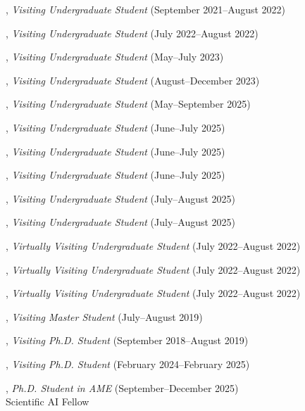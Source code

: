 \documentclass[10pt]{article}
\newenvironment{myindentpar}[1]%
{\begin{list}{}%
         {\setlength{\leftmargin}{#1}}%
         \item[]%
}
{\end{list}}
\newcounter{list}
\begin{document}
\begin{myindentpar}{0.75cm}
\hspace{-0.75cm}{\bf Yunxiang Yan}, \textit{Visiting Undergraduate Student} (September 2021--August 2022)

\hspace{-0.75cm}{\bf Qi Liu}, \textit{Visiting Undergraduate Student} (July 2022--August 2022)

\hspace{-0.75cm}{\bf Kairui Hu}, \textit{Visiting Undergraduate Student} (May--July 2023)

\hspace{-0.75cm}{\bf Yuxuan Kuang}, \textit{Visiting Undergraduate Student} (August--December 2023)

\hspace{-0.75cm}{\bf Quang Dao}, \textit{Visiting Undergraduate Student} (May--September 2025)

\hspace{-0.75cm}{\bf Beibei Liu}, \textit{Visiting Undergraduate Student} (June--July 2025)

\hspace{-0.75cm}{\bf Han Yan}, \textit{Visiting Undergraduate Student} (June--July 2025)

\hspace{-0.75cm}{\bf Tengchao Yang}, \textit{Visiting Undergraduate Student} (June--July 2025)

\hspace{-0.75cm}{\bf Sichen Guo}, \textit{Visiting Undergraduate Student} (July--August 2025)

\hspace{-0.75cm}{\bf Xuanjia Qiao}, \textit{Visiting Undergraduate Student} (July--August 2025)

\hspace{-0.75cm}{\bf Xuan Zhang}, \textit{Virtually Visiting Undergraduate Student} (July 2022--August 2022)

\hspace{-0.75cm}{\bf Dong Liu}, \textit{Virtually Visiting Undergraduate Student} (July 2022--August 2022)

\hspace{-0.75cm}{\bf Yuchen Li}, \textit{Virtually Visiting Undergraduate Student} (July 2022--August 2022)

\hspace{-0.75cm}{\bf Zijian Hu}, \textit{Visiting Master Student} (July--August 2019)

\hspace{-0.75cm}{\bf Tianwen Jiang}, \textit{Visiting Ph.D. Student} (September 2018--August 2019)

\hspace{-0.75cm}{\bf Zhenyu Wu}, \textit{Visiting Ph.D. Student} (February 2024--February 2025)

\hspace{-0.75cm}{\bf Orlando Barreto}, \textit{Ph.D. Student in AME} (September--December 2025) \\
	{Scientific AI Fellow}

\end{myindentpar}
\end{document}
